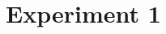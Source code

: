\documentclass[10pt,letterpaper]{article}
\newcommand{\todo}[1]{\textcolor{red}{\textbf{TODO:} #1}}
\begin{document}

\section{Experiment 1}
\end{document}
